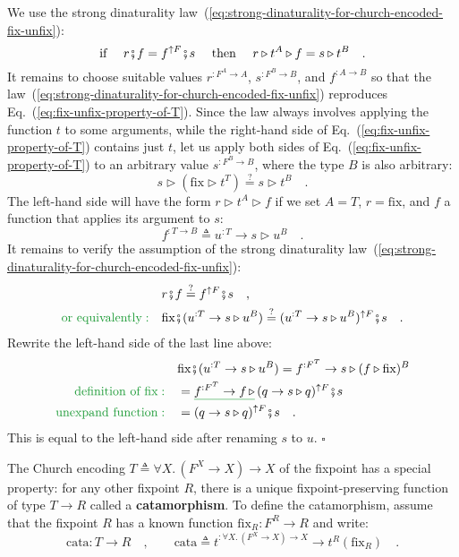 We use the strong dinaturality law~(\ref{eq:strong-dinaturality-for-church-encoded-fix-unfix}):
\[
\text{if }\quad r\bef f=f^{\uparrow F}\bef s\quad\text{ then }\quad r\triangleright t^{A}\triangleright f=s\triangleright t^{B}\quad.
\]
It remains to choose suitable values $r^{:F^{A}\rightarrow A}$, $s^{:F^{B}\rightarrow B}$,
and $f^{:A\rightarrow B}$ so that the law~(\ref{eq:strong-dinaturality-for-church-encoded-fix-unfix})
reproduces Eq.~(\ref{eq:fix-unfix-property-of-T}). Since the law
always involves applying the function $t$ to some arguments, while
the right-hand side of Eq.~(\ref{eq:fix-unfix-property-of-T}) contains
just $t$, let us apply both sides of Eq.~(\ref{eq:fix-unfix-property-of-T})
to an arbitrary value $s^{:F^{B}\rightarrow B}$, where the type $B$
is also arbitrary:
\[
s\triangleright(\text{fix}\triangleright t^{T})\overset{?}{=}s\triangleright t^{B}\quad.
\]
The left-hand side will have the form $r\triangleright t^{A}\triangleright f$
if we set $A=T$, $r=\text{fix}$, and $f$ a function that applies
its argument to $s$:
\[
f^{:T\rightarrow B}\triangleq u^{:T}\rightarrow s\triangleright u^{B}\quad.
\]
It remains to verify the assumption of the strong dinaturality law~(\ref{eq:strong-dinaturality-for-church-encoded-fix-unfix}):
\begin{align*}
 & r\bef f\overset{?}{=}f^{\uparrow F}\bef s\quad,\\
{\color{greenunder}\text{or equivalently}:}\quad & \text{fix}\bef(u^{:T}\rightarrow s\triangleright u^{B})\overset{?}{=}(u^{:T}\rightarrow s\triangleright u^{B})^{\uparrow F}\bef s\quad.
\end{align*}
Rewrite the left-hand side of the last line above:
\begin{align*}
 & \text{fix}\bef(u^{:T}\rightarrow s\triangleright u^{B})=f^{:F^{T}}\rightarrow s\triangleright(f\triangleright\text{fix})^{B}\\
{\color{greenunder}\text{definition of }\text{fix}:}\quad & =\gunderline{f^{:F^{T}}\rightarrow f\,\triangleright}\,(q\rightarrow s\triangleright q)^{\uparrow F}\bef s\\
{\color{greenunder}\text{unexpand function}:}\quad & =(q\rightarrow s\triangleright q)^{\uparrow F}\bef s\quad.
\end{align*}
This is equal to the left-hand side after renaming $s$ to $u$. $\square$

The Church encoding $T\triangleq\forall X.\,(F^{X}\rightarrow X)\rightarrow X$
of the fixpoint has a special property: for any other fixpoint $R$,
there is a unique fixpoint-preserving function of type $T\rightarrow R$
called a \textbf{catamorphism}. To define the
catamorphism, assume that the fixpoint $R$ has a known function $\text{fix}_{R}:F^{R}\rightarrow R$
and write:
\[
\text{cata}:T\rightarrow R\quad,\quad\quad\text{cata}\triangleq t^{:\forall X.\,(F^{X}\rightarrow X)\rightarrow X}\rightarrow t^{R}(\text{fix}_{R})\quad.
\]


